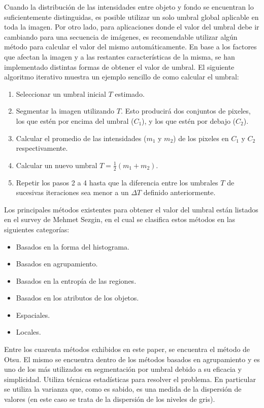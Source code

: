 Cuando la distribución de las intensidades entre objeto y fondo se encuentran lo suficientemente distinguidas, es posible utilizar un solo umbral global aplicable en toda la imagen. Por otro lado, para aplicaciones donde el valor del umbral debe ir cambiando para una secuencia de imágenes, es recomendable utilizar algún método para calcular el valor del mismo automáticamente. En base a los factores que afectan la imagen y a las restantes características de la misma, se han implementado distintas formas de obtener el valor de umbral. El siguiente algoritmo iterativo muestra un ejemplo sencillo de como calcular el umbral:

\begin{enumerate}
\item Seleccionar un umbral inicial $T$ estimado.
\item Segmentar la imagen utilizando $T$. Esto producirá dos conjuntos de pixeles, los que estén por encima del umbral ($C_1$), y los que estén por debajo ($C_2$).
\item Calcular el promedio de las intensidades ($m_1$ y $m_2$) de los pixeles en $C_1$ y $C_2$ respectivamente.
\item Calcular un nuevo umbral $T = \frac{1}{2}(m_1 + m_2)$.
\item Repetir los pasos 2 a 4 hasta que la diferencia entre los umbrales $T$ de sucesivas iteraciones sea menor a un ${\Delta}T$ definido anteriormente.
\end{enumerate}

Los principales métodos existentes para obtener el valor del umbral están listados en el survey de Mehmet Sezgin\cite{surveyThreshold}, en el cual se clasifica estos métodos en las siguientes categorías:
\begin{itemize}
\item Basados en la forma del histograma.
\item Basados en agrupamiento.
\item Basados en la entropía de las regiones.
\item Basados en los atributos de los objetos.
\item Espaciales.
\item Locales.
\end{itemize}

Entre los cuarenta métodos exhibidos en este paper, se encuentra el método de Otsu\cite{otsu}. El mismo se encuentra dentro de los métodos basados en agrupamiento y es uno de los más utilizados en segmentación por umbral debido a su eficacia y simplicidad. Utiliza técnicas estadísticas para resolver el problema. En particular se utiliza la varianza que, como es sabido, es una medida de la dispersión de valores (en este caso se trata de la dispersión de los niveles de gris).


